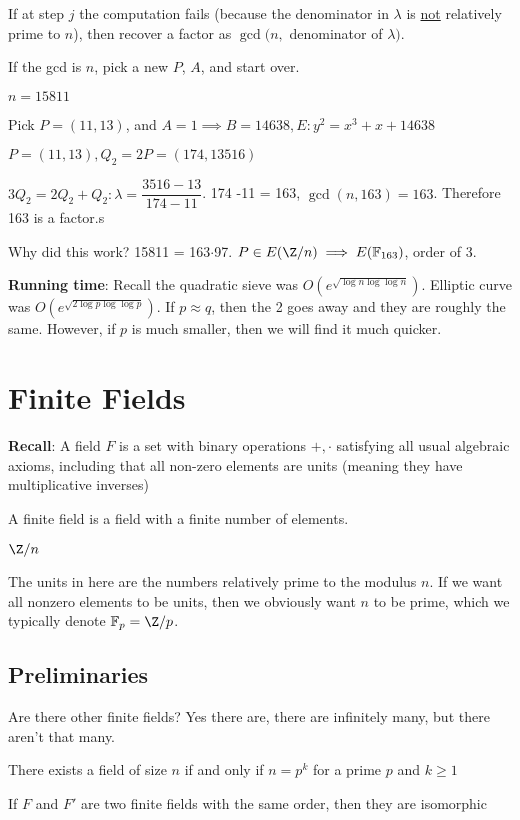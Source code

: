 \documentclass[twoside, 10pt]{article}
\newcommand{\F}{\mathbb{F}}
\begin{document}
If at step $j$ the computation fails (because the denominator in $\lambda$ is \underline{not} relatively prime to $n$), then recover a factor as $\gcd(n,$ denominator of $\lambda)$. 

\begin{rmk}
    If the gcd is $n$, pick a new $P$, $A$, and start over.
\end{rmk}

\begin{exm*}
    $n = 15811$
\end{exm*}
Pick $P = (11, 13)$, and $A =1 \implies B = 14638, E: y^2 = x^3 + x + 14638$

$P = (11, 13), Q_2 = 2P = (174, 13516)$

$3Q_2 = 2Q_2 + Q_2: \lambda = \dfrac{3516 - 13}{174 -11}$. 174 -11 = 163, $\gcd(n, 163) = 163$. Therefore 163 is a factor.s

Why did this work? 15811 = 163$\cdot$97. $P \in E(\Z/n) \implies E(\F_{163})$, order of 3.

\textbf{Running time}: Recall the quadratic sieve was $O(e^{\sqrt{\log n \log\log n}})$. Elliptic curve was $O(e^{\sqrt{2\log p \log\log p}})$. If $p \approx q$, then the 2 goes away and they are roughly the same. However, if $p$ is much smaller, then we will find it much quicker.

\section{Finite Fields}
\textbf{Recall}: A field $F$ is a set with binary operations $+, \cdot$ satisfying all usual algebraic axioms, including that all non-zero elements are units (meaning they have multiplicative inverses)

A finite field is a field with a finite number of elements. 

\begin{exm*}
    $\Z/n$
\end{exm*}
The units in here are the numbers relatively prime to the modulus $n$. If we want all nonzero elements to be units, then we obviously want $n$ to be prime, which we typically denote $\F_p = \Z/p$. 

\subsection{Preliminaries} Are there other finite fields? Yes there are, there are infinitely many, but there aren't that many.

\begin{thm}
    There exists a field of size $n$ if and only if $n = p^k$ for a prime $p$ and $k \geq 1$
\end{thm}
\begin{thm}
    If $F$ and $F'$ are two finite fields with the same order, then they are isomorphic
\end{thm}
\end{document}
